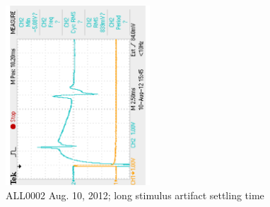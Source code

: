 \begin{figure}[H]
	\centering 
	\begin{singlespace}
	\includegraphics[trim=0 0.1in 0 0.1in,clip,angle=-90,width=0.48\textwidth]{./figures/F0002TEK_settle_120810} %
	\caption{ALL0002 Aug. 10, 2012; long stimulus artifact settling time\label{fig:settle}}
	\end{singlespace}
\end{figure}

